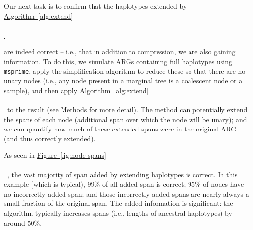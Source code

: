 \documentclass[10pt,twoside,lineno]{gsajnl}
\newcommand{\msprime}{\texttt{msprime}}
\newcommand{\algorithmref}[2][]{%
	\hyperref[{#2}]{%
		Algorithm~\ref*{#2}%
		\ifx\\#1\\%
		\else
		\,#1%
		\fi
	}%
}
\newcommand*{\figref}[2][]{%
	\hyperref[{#2}]{%
		Figure~\ref*{#2}%
		\ifx\\#1\\%
		\else
		\,#1%
		\fi
	}%
}
\begin{document}
Our next task is to confirm that the haplotypes extended by \algorithmref{alg:extend}
are indeed correct -- i.e., that in addition to compression, we are also gaining information.
To do this, 
we simulate ARGs containing full haplotypes using \msprime{},
apply the simplification algorithm to reduce these so that there are no unary nodes
(i.e., any node present in a marginal tree is a coalescent node or a sample),
and then apply \algorithmref{alg:extend} to the result
(see Methods for more detail).
The method can potentially extend the spans of each node
(additional span over which the node will be unary);
and we can quantify how much of these extended spans were in the original ARG
(and thus correctly extended).

%
%

As seen in \figref{fig:node-spans},
the vast majority of span added by extending haplotypes is correct.
In this example (which is typical),
99\% of all added span is correct;
95\% of nodes have no incorrectly added span;
and those incorrectly added spans are nearly always a small fraction of the original span.
The added information is significant:
the algorithm typically increases spans (i.e., lengths of ancestral haplotypes)
by around 50\%.
\end{document}

